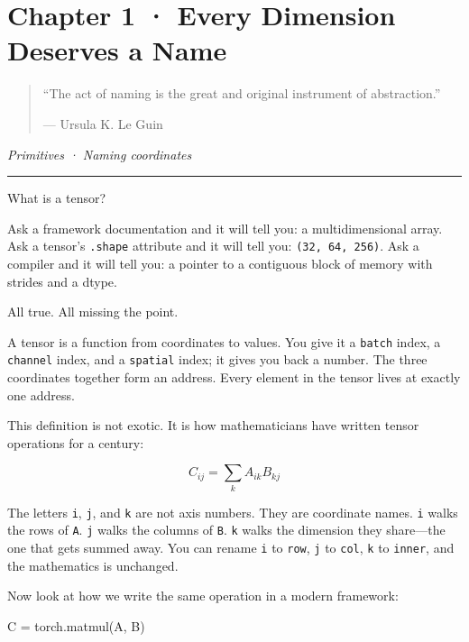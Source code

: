 \documentclass[11pt,]{article}
\newenvironment{Shaded}{}{}
\newcommand{\NormalTok}[1]{#1}
\newcommand{\OperatorTok}[1]{\textcolor[rgb]{0.40,0.40,0.40}{#1}}
\begin{document}
\hypertarget{chapter-1-every-dimension-deserves-a-name}{%
\section{Chapter 1 · Every Dimension Deserves a
Name}\label{chapter-1-every-dimension-deserves-a-name}}

\begin{quote}
``The act of naming is the great and original instrument of
abstraction.''

--- Ursula K. Le Guin
\end{quote}

\emph{Primitives · Naming coordinates}

\begin{center}\rule{0.5\linewidth}{0.4pt}\end{center}

What is a tensor?

Ask a framework documentation and it will tell you: a multidimensional
array. Ask a tensor's \texttt{.shape} attribute and it will tell you:
\texttt{(32,\ 64,\ 256)}. Ask a compiler and it will tell you: a pointer
to a contiguous block of memory with strides and a dtype.

All true. All missing the point.

A tensor is a function from coordinates to values. You give it a
\texttt{batch} index, a \texttt{channel} index, and a \texttt{spatial}
index; it gives you back a number. The three coordinates together form
an address. Every element in the tensor lives at exactly one address.

This definition is not exotic. It is how mathematicians have written
tensor operations for a century:

\[C_{ij} = \sum_k A_{ik} B_{kj}\]

The letters \texttt{i}, \texttt{j}, and \texttt{k} are not axis numbers.
They are coordinate names. \texttt{i} walks the rows of \texttt{A}.
\texttt{j} walks the columns of \texttt{B}. \texttt{k} walks the
dimension they share---the one that gets summed away. You can rename
\texttt{i} to \texttt{row}, \texttt{j} to \texttt{col}, \texttt{k} to
\texttt{inner}, and the mathematics is unchanged.

Now look at how we write the same operation in a modern framework:

\begin{Shaded}
\begin{Highlighting}[]
\NormalTok{C }\OperatorTok{=}\NormalTok{ torch.matmul(A, B)}
\end{Highlighting}
\end{Shaded}
\end{document}

